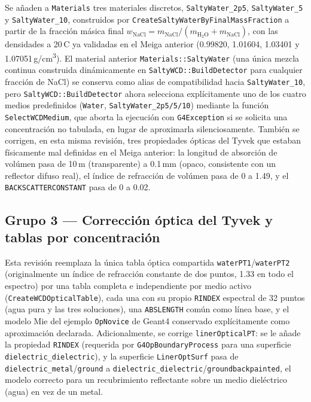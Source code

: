 \documentclass[11pt,a4paper]{article}
\newcommand{\codigo}[1]{\nolinkurl{#1}}
\begin{document}
Se añaden a \codigo{Materials} tres materiales discretos,
\codigo{SaltyWater\_2p5}, \codigo{SaltyWater\_5} y \codigo{SaltyWater\_10},
construidos por \codigo{CreateSaltyWaterByFinalMassFraction} a partir de la
fracción másica final $w_{\text{NaCl}} = m_{\text{NaCl}} / (m_{\text{H}_2\text{O}} + m_{\text{NaCl}})$,
con las densidades a 20\,\textdegree C ya validadas en el Meiga anterior
(0.99820, 1.01604, 1.03401 y 1.07051\,g/cm\textsuperscript{3}). El
material anterior \codigo{Materials::SaltyWater} (una única mezcla
continua construida dinámicamente en \codigo{SaltyWCD::BuildDetector} para
cualquier fracción de NaCl) se conserva como alias de compatibilidad hacia
\codigo{SaltyWater\_10}, pero \codigo{SaltyWCD::BuildDetector} ahora
selecciona explícitamente uno de los cuatro medios predefinidos
(\codigo{Water}, \codigo{SaltyWater\_2p5/5/10}) mediante la función
\codigo{SelectWCDMedium}, que aborta la ejecución con
\codigo{G4Exception} si se solicita una concentración no tabulada, en
lugar de aproximarla silenciosamente. También se corrigen, en esta misma
revisión, tres propiedades ópticas del Tyvek que estaban físicamente mal
definidas en el Meiga anterior: la longitud de absorción de vol\'umen
pasa de 10\,m (transparente) a 0.1\,mm (opaco, consistente con un
reflector difuso real), el índice de refracción de vol\'umen pasa de 0 a
1.49, y el \codigo{BACKSCATTERCONSTANT} pasa de 0 a 0.02.

\subsection{Grupo 3 --- Corrección óptica del Tyvek y tablas por concentración}

Esta revisión reemplaza la única tabla óptica compartida
\codigo{waterPT1}/\codigo{waterPT2} (originalmente un índice de refracción
constante de dos puntos, 1.33 en todo el espectro) por una tabla completa
e independiente por medio activo (\codigo{CreateWCDOpticalTable}), cada una
con su propio \codigo{RINDEX} espectral de 32 puntos (agua pura y las tres
soluciones), una \codigo{ABSLENGTH} común como línea base, y el modelo Mie
del ejemplo \codigo{OpNovice} de Geant4 conservado explícitamente como
aproximación declarada. Adicionalmente, se corrige
\codigo{linerOpticalPT}: se le añade la propiedad \codigo{RINDEX}
(requerida por \codigo{G4OpBoundaryProcess} para una superficie
\codigo{dielectric\_dielectric}), y la superficie \codigo{LinerOptSurf}
pasa de \codigo{dielectric\_metal}/\codigo{ground} a
\codigo{dielectric\_dielectric}/\codigo{groundbackpainted}, el modelo
correcto para un recubrimiento reflectante sobre un medio dieléctrico
(agua) en vez de un metal.
\end{document}
